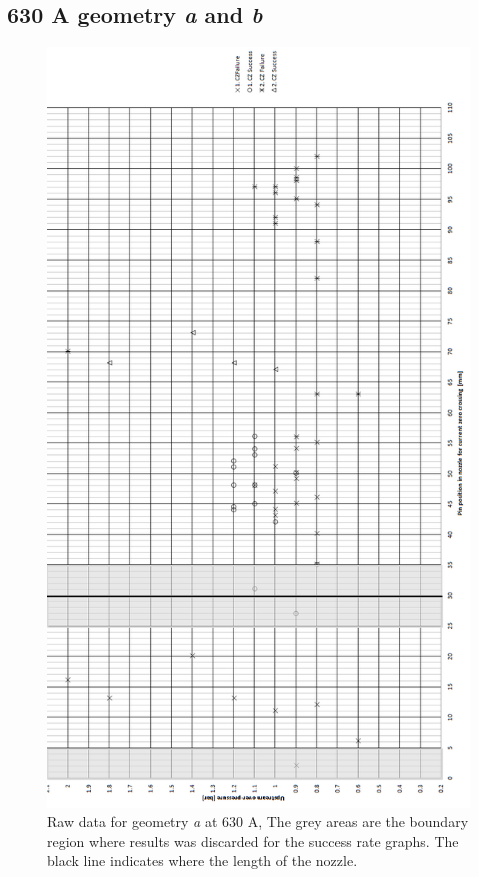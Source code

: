 \documentclass[10pt,a4paper]{article}
\begin{document}
\subsection{630 A geometry \textit{a} and \textit{b}} \label{app:testResults630A}
\begin{figure}[H]
\centering
\includegraphics[scale=0.55]{Bilder/Results/rawData630AgeoA.png}
\caption{Raw data for geometry \textit{a} at 630 A, The grey areas are the boundary region where results was discarded for the success rate graphs. The black line indicates where the length of the nozzle.} \label{fig:rawData630AgeoA}
\end{figure}
\newpage
\end{document}
